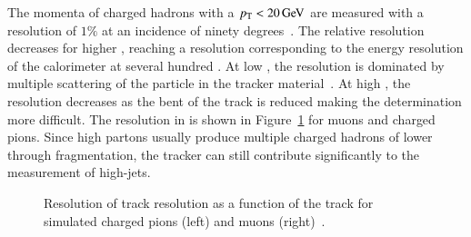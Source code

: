 The momenta of charged hadrons with a $p_{\mathrm{T}} < 20 \,\text{Ge\hspace{-.08em}V}$ are measured with a resolution of $1\%$ at an incidence of ninety degrees~\cite{Sirunyan:2017ulk}. The relative resolution decreases for higher \pt, reaching a resolution corresponding to 
the energy resolution of the calorimeter at several hundred \GeV. 
At low \pt, the resolution is dominated by multiple scattering of the particle in the tracker material~\cite{1748-0221-9-10-P10009}. At high \pt, the resolution decreases as the bent of the track is
reduced making the \pt determination more difficult. The resolution in \pt is shown in Figure~\ref{fig:det_trackeffs} for muons and charged pions.
Since high \pt partons usually produce multiple charged hadrons of lower \pt through fragmentation, the tracker can still contribute significantly 
to the measurement of high-\pt jets.

\begin{figure}[htbp!]
  \begin{center}

\caption{Resolution of track \pt resolution as a function of the track \pt for simulated charged pions (left) and muons (right)~\cite{1748-0221-9-10-P10009}.
  \label{fig:det_trackeffs}}
  \end{center}
\end{figure}


